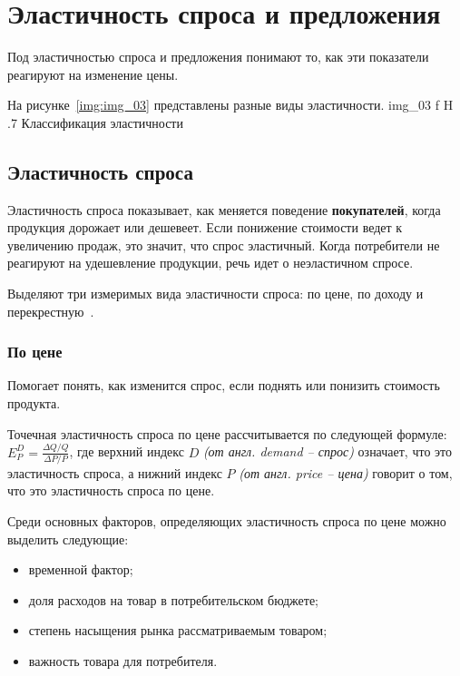 \chapter{Эластичность спроса и предложения}

Под эластичностью спроса и предложения понимают то, как эти показатели реагируют на изменение цены. 

На рисунке~\ref{img:img_03} представлены разные виды эластичности.
{img_03}
{f}
{H}
{.7\textwidth}
{Классификация эластичности~\cite{elast1}}

\section{Эластичность спроса}

Эластичность спроса показывает, как меняется поведение \textbf{покупателей}, когда продукция дорожает или дешевеет. 
Если понижение стоимости ведет к увеличению продаж, это значит, что спрос эластичный.
Когда потребители не реагируют на удешевление продукции, речь идет о неэластичном спросе.

Выделяют три измеримых вида эластичности спроса: по цене, по доходу и перекрестную~\cite{elast2}.

\subsection{По цене}
Помогает понять, как изменится спрос, если поднять или понизить стоимость продукта. 

Точечная эластичность спроса по цене рассчитывается по следующей формуле: $E_{P}^{D}=\frac{\Delta Q/Q}{\Delta P/P}$,
где верхний индекс $D$ \textit{(от англ. demand -- спрос)} означает, что это эластичность спроса, а нижний индекс $P$ \textit{(от англ. price -- цена)} говорит о том, что это эластичность спроса по цене.

Среди основных факторов, определяющих эластичность спроса по цене можно выделить следующие: 
\begin{itemize}
	\item временной фактор;
	\item доля расходов на товар в потребительском бюджете;
	\item степень насыщения рынка рассматриваемым товаром;
	\item важность товара для потребителя.
\end{itemize}

